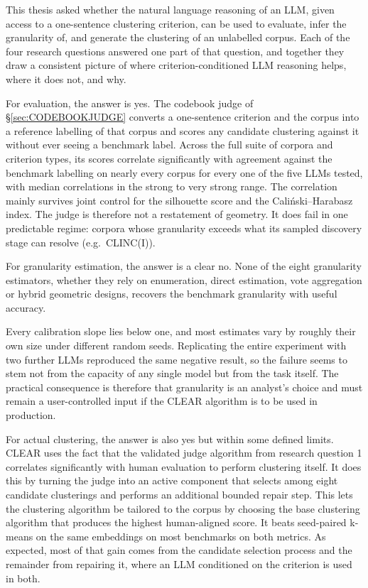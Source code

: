 \documentclass[11pt,a4paper,oneside]{report}
\begin{document}
This thesis asked whether the natural language reasoning of an LLM,
given access to a one-sentence clustering criterion, can be used
to evaluate, infer the granularity of, and generate the clustering of an unlabelled corpus. Each
of the four research questions answered one part of that question, and
together they draw a consistent picture of where criterion-conditioned
LLM reasoning helps, where it does not, and why.

For evaluation, the answer is yes. The codebook judge of
\S\ref{sec:CODEBOOKJUDGE} converts a one-sentence criterion and the corpus into a
reference labelling of that corpus and scores any candidate clustering against it
without ever seeing a benchmark label. Across the full suite of corpora
and criterion types, its scores correlate significantly with agreement
against the benchmark labelling on nearly every corpus for every one of the
five LLMs tested, with median correlations in the strong to very
strong range. The correlation mainly survives joint control for the
silhouette score and the Cali\'nski--Harabasz index. The judge is
therefore not a restatement of geometry. It does fail in one predictable regime: corpora whose
granularity exceeds what its sampled discovery stage can resolve (e.g.\ CLINC(I)). 


For granularity estimation, the answer is a clear no. None of the eight granularity estimators, whether they rely on enumeration, direct estimation, vote aggregation or hybrid
geometric designs, recovers the benchmark granularity with useful
accuracy.




Every calibration slope lies below one, and most estimates
vary by roughly their own size under different random seeds. Replicating the entire experiment with two further LLMs reproduced the
same negative result, so the failure seems to stem not from the capacity of
any single model but from the task itself. The practical consequence is therefore that granularity is an analyst's choice and must
remain a user-controlled input if the CLEAR algorithm is to be used in production.




For actual clustering, the answer is also yes but within some defined limits. CLEAR uses the fact that the validated judge algorithm from research question 1 correlates significantly with human evaluation to perform clustering itself. It does this by turning the judge into an active component that selects among eight candidate clusterings and performs an additional bounded repair step. This lets the clustering algorithm be tailored to the corpus by choosing the base clustering algorithm that produces the highest human-aligned score. It beats seed-paired k-means on the same embeddings on most benchmarks on both metrics. As expected, most of that gain comes from the candidate selection process and the remainder from repairing it, where an LLM conditioned on the criterion is used in both. 
\end{document}
